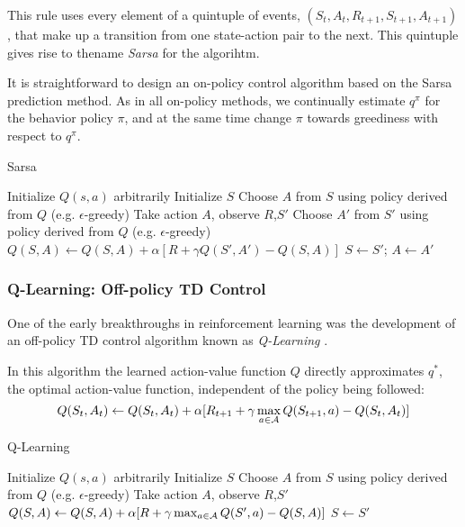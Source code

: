 This rule uses every element of a quintuple of events, $(S_t, A_t, R_{t+1}, S_{t+1}, A_{t+1})$, that make up a transition from one state-action pair to the next.
This quintuple gives rise to thename \textit{Sarsa} for the algorihtm.

It is straightforward to design an on-policy control algorithm based on the Sarsa prediction method. As in all on-policy methods, we continually estimate $q^\pi$
for the behavior policy $\pi$, and at the same time change $\pi$ towards greediness with respect to $q^\pi$.

\begin{algorithm}[H]
    \caption{Sarsa}
    \label{alg:sarsa}
    \begin{algorithmic}[1]
        \STATE Initialize $Q(s,a)$ arbitrarily
        \LOOP
            \STATE Initialize $S$
            \STATE Choose $A$ from $S$ using policy derived from $Q$ (e.g. $\epsilon$-greedy)
            \REPEAT
                \STATE Take action $A$, observe $R$,$S'$
                \STATE Choose $A'$ from $S'$ using policy derived from $Q$ (e.g. $\epsilon$-greedy)
                \STATE $Q(S,A) \gets Q(S,A) + \alpha[R + \gamma Q(S',A') - Q(S, A)]$
                \STATE $S \gets S'$; $A \gets A'$
        \ENDLOOP
    \end{algorithmic}
\end{algorithm}

\subsubsection{Q-Learning: Off-policy TD Control}
One of the early breakthroughs in reinforcement learning was the development of an off-policy TD control algorithm known as \textit{Q-Learning}
\cite{Watkins:1989}.

In this algorithm the learned action-value function $Q$ directly approximates $q^*$, the optimal action-value function, independent of the 
policy being followed:
\begin{equation*}
    Q(S_t,A_t) \gets Q(S_t,A_t) + \alpha [R_{t+1} + \gamma \max_{a \in \mathcal{A}}Q(S_{t+1}, a) - Q(S_t, A_t)]
\end{equation*}

\begin{algorithm}[H]
    \caption{Q-Learning}
    \label{alg:q-learning}
    \begin{algorithmic}[1]
        \STATE Initialize $Q(s,a)$ arbitrarily
        \LOOP
            \STATE Initialize $S$
            \STATE Choose $A$ from $S$ using policy derived from $Q$ (e.g. $\epsilon$-greedy)
            \REPEAT
                \STATE Take action $A$, observe $R$,$S'$
                \STATE $Q(S,A) \gets Q(S,A) + \alpha[R + \gamma \max_{a \in \mathcal{A}}Q(S',a) - Q(S, A)]$
                \STATE $S \gets S'$
        \ENDLOOP
    \end{algorithmic}
\end{algorithm}

